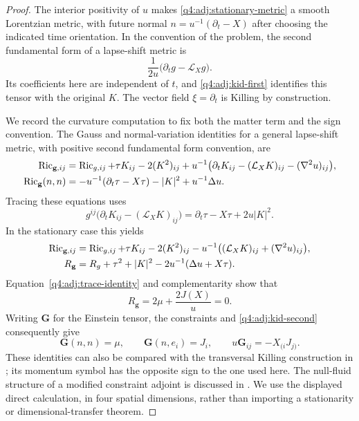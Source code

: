 \begin{proof}
The interior positivity of $u$ makes \eqref{q4:adj:stationary-metric} a smooth
Lorentzian metric, with future normal $n=u^{-1}(\partial_t-X)$ after choosing
the indicated time orientation.  In the convention of the problem, the
second fundamental form of a lapse-shift metric is
\[
 \frac1{2u}\bigl(\partial_tg-\mathcal L_Xg\bigr).
\]
Its coefficients here are independent of $t$, and
\eqref{q4:adj:kid-first} identifies this tensor with the original $K$.
The vector field $\xi=\partial_t$ is Killing by construction.

We record the curvature computation to fix both the matter term and the
sign convention.  The Gauss and normal-variation identities for a general
lapse-shift metric, with positive second fundamental form convention, are
\begin{align*}
 \operatorname{Ric}_{\mathbf g,ij}
  &=\operatorname{Ric}_{g,ij}+\tau K_{ij}-2(K^2)_{ij}
    +u^{-1}\bigl(\partial_tK_{ij}
           -(\mathcal L_XK)_{ij}-(\nabla^2u)_{ij}\bigr),\\
 \operatorname{Ric}_{\mathbf g}(n,n)
  &=-u^{-1}(\partial_t\tau-X\tau)-|K|^2+u^{-1}\Delta u.
\end{align*}
Tracing these equations uses
\[
 g^{ij}\bigl(\partial_tK_{ij}-(\mathcal L_XK)_{ij}\bigr)
 =\partial_t\tau-X\tau+2u|K|^2.
\]
In the stationary case this yields
\begin{align}
 \operatorname{Ric}_{\mathbf g,ij}
 &=\operatorname{Ric}_{g,ij}+\tau K_{ij}-2(K^2)_{ij}
      -u^{-1}\bigl((\mathcal L_XK)_{ij}+(\nabla^2u)_{ij}\bigr),
 \label{q4:adj:spatial-ricci}\\
 R_{\mathbf g}
 &=R_g+\tau^2+|K|^2-2u^{-1}(\Delta u+X\tau).
 \label{q4:adj:spacetime-scalar}
\end{align}
Equation~\eqref{q4:adj:trace-identity} and complementarity show that
\[
 R_{\mathbf g}=2\mu+\frac{2J(X)}u=0.
\]
Writing $\mathbf G$ for the Einstein tensor, the constraints and
\eqref{q4:adj:kid-second} consequently give
\begin{equation}
 \mathbf G(n,n)=\mu,\qquad
 \mathbf G(n,e_i)=J_i,\qquad
 u\mathbf G_{ij}=-X_{(i}J_{j)}.
 \label{q4:adj:einstein-components}
\end{equation}
These identities can also be compared with the transversal Killing
construction in \cite{BeigChrusciel1997KID}; its momentum symbol has the
opposite sign to the one used here.  The null-fluid structure of a modified
constraint adjoint is discussed in \cite[Section~6.1]{HuangLee2024Bartnik}.
We use the displayed direct calculation, in four spatial dimensions, rather
than importing a stationarity or dimensional-transfer theorem.


\end{proof}
